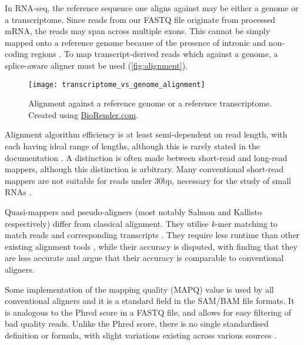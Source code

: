 In RNA-seq, the reference sequence one aligns against may be either a genome or a transcriptome. Since reads from our FASTQ file originate from processed mRNA, the reads may span across multiple exons. This cannot be simply mapped onto a reference genome because of the presence of intronic and non-coding regions \citep{rnadataanalysis2020}. To map transcript-derived reads which against a genome, a splice-aware aligner must be used (\autoref{fig:alignment}).

\begin{figure}[!h]
    \centering
    \texttt{[image: transcriptome\_vs\_genome\_alignment]}
    \caption[Alignment against a reference genome or a reference transcriptome]{Alignment against a reference genome or a reference transcriptome. Created using \href{https://biorender.com/}{BioRender.com}. } 
    \label{fig:alignment}
\end{figure}

Alignment algorithm efficiency is at least semi-dependent on read length, with each having ideal range of lengths, although this is rarely stated in the documentation \citep{albert2020biostar}. A distinction is often made between short-read and long-read mappers, although this distinction is arbitrary. Many conventional short-read mappers are not suitable for reads under 30bp, necessary for the study of small RNAs \citep{albert2020biostar, ziemann2016evaluation}.

Quasi-mappers and pseudo-aligners (most notably Salmon \citep{patro2017salmon} and Kallisto \citep{bray2016near} respectively) differ from classical alignment. They utilise \textit{k}-mer matching to match reads and corresponding transcripts \citep{rnadataanalysis2020}. They require less runtime than other existing alignment tools \citep{Zhang2017}, while their accuracy is disputed, with \cite{srivastava2020alignment} finding that they are less accurate and \cite{Zhang2017, Schaarschmidt2020} argue that their accuracy is comparable to conventional aligners.

Some implementation of the mapping quality (MAPQ) value is used by all conventional aligners and it is a standard field in the SAM/BAM file formats. It is analogous to the Phred score in a FASTQ file, and allows for easy filtering of bad quality reads. Unlike the Phred score, there is no single standardised definition or formula, with slight variations existing across various sources \citep{andrews2016mapq}.


